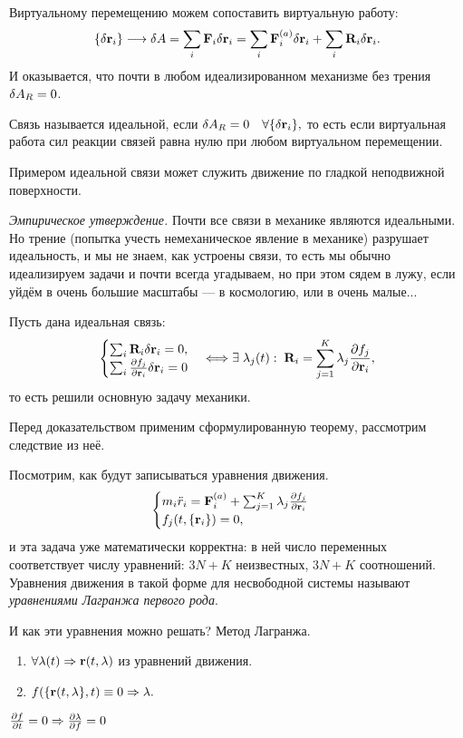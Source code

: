 Виртуальному перемещению можем сопоставить виртуальную работу:
\[\{\var \vb{r}_i\} \longrightarrow \var A = \sum_i \vb{F}_i \var \vb{r}_i = \sum_i \vb{F}_i^{(a)} \var \vb{r}_i + \sum_i \vb{R}_i \var \vb{r}_i.\]
И оказывается, что почти в любом идеализированном механизме без трения $\var A_R = 0$.

\begin{dfn}
Связь называется идеальной, если $\var A_R = 0 \quad \forall \{\var \vb{r}_i\},$ то есть если виртуальная работа сил реакции связей равна нулю при любом виртуальном перемещении.
\end{dfn}
\noindent Примером идеальной связи может служить движение по гладкой неподвижной поверхности.


\textit{Эмпирическое утверждение.} Почти все связи в механике являются идеальными. Но трение  (попытка учесть немеханическое явление в механике) разрушает идеальность, и мы не знаем, как устроены связи, то есть мы обычно идеализируем задачи и почти всегда угадываем, но при этом сядем в лужу, если уйдём в очень большие масштабы --- в космологию, или в очень малые...

\begin{thm}
Пусть дана идеальная связь:
\begin{equation}
\begin{cases}
\sum_i \vb{R}_i \var \vb{r}_i = 0,\\
\sum_i \pdv{f_j}{\vb{r}_i} \var \vb{r}_i = 0 
\end{cases} \Longleftrightarrow
\exists\; \lambda_j (t): \; \vb{R}_i = \sum_{j=1}^K \lambda_j \pdv{f_j}{\vb{r}_i},
\end{equation}
то есть решили основную задачу механики.
\end{thm}
Перед доказательством применим сформулированную теорему, рассмотрим следствие из неё. 
\begin{cns} Посмотрим, как будут записываться уравнения движения.
\begin{equation}
\begin{cases}
m_i \ddot{r}_i = \vb{F}_i^{(a)} + \sum_{j=1}^K \lambda_j \pdv{f_j}{\vb{r}_i}\\
f_j (t, \{\vb{r}_i\}) = 0,
\end{cases}
\end{equation}
и эта задача уже математически корректна: в ней число переменных соответствует числу уравнений: $3N+K$ неизвестных, $3N+K$ соотношений. Уравнения движения в такой форме для несвободной системы называют \textit{уравнениями Лагранжа первого рода}. 

И как эти уравнения можно решать?
Метод Лагранжа.
\begin{enumerate}
\item $\forall \lambda(t) \Rightarrow \vb{r}(t, \lambda)$ из уравнений движения.
\item $f(\{\vb{r}(t, \lambda\}, t) \equiv 0 \Rightarrow \lambda.$
\end{enumerate}
\end{cns}
\begin{rmk}
$\pdv{f}{t} = 0 \Rightarrow \pdv{\lambda}{f} = 0$
\end{rmk}
